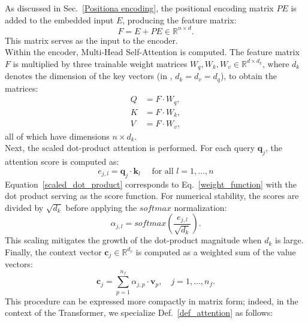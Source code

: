 As discussed in Sec.~\ref{Positiona encoding}, the positional encoding matrix $PE$ is added to the embedded input $E$, producing the feature matrix:
\begin{equation}
    F = E + PE \in \mathbb{R}^{n \times d}.
\end{equation}
This matrix serves as the input to the encoder.\\ 
Within the encoder, Multi-Head Self-Attention is computed. The feature matrix $F$ is multiplied by three trainable weight matrices $W_q, W_k, W_v \in \mathbb{R}^{d \times d_k}$, where $d_k$ denotes the dimension of the key vectors (in \cite{Att_is_all_u_need}, $d_k = d_v = d_q$), to obtain the matrices:
\begin{equation}\label{eq_from_features_to_matrix}
\begin{aligned}
    Q &= F \cdot W_q, \\
    K &= F \cdot W_k, \\
    V &= F \cdot W_v,
\end{aligned}
\end{equation}
all of which have dimensions $n \times d_k$.\\
Next, the scaled dot-product attention is performed. For each query $\mathbf{q}_j$, the attention score is computed as:
\begin{equation}\label{scaled_dot_product}
    e_{j,l} = \mathbf{q}_j \cdot \mathbf{k}_l \quad \text{ for all } l=1,\dots,n
\end{equation}
Equation~\eqref{scaled_dot_product} corresponds to Eq.~\eqref{weight_function} with the dot product serving as the score function.  
For numerical stability, the scores are divided by $\sqrt{d_k}$ before applying the $softmax$ normalization:
\begin{equation}
    \alpha_{j,l} = softmax\left(\frac{e_{j,l}}{\sqrt{d_k}}\right).
\end{equation}
This scaling mitigates the growth of the dot-product magnitude when $d_k$ is large.\\
Finally, the context vector $\mathbf{c}_j \in \mathbb{R}^{d_v}$ is computed as a weighted sum of the value vectors:
\begin{equation}
    \mathbf{c}_j = \sum_{p=1}^{n_{f}} \alpha_{j,p} \cdot \mathbf{v}_p, \quad j = 1, \dots, n_{f}.
\end{equation}
This procedure can be expressed more compactly in matrix form; indeed, in the context of the Transformer, we specialize Def.~\ref{def_attention} as follows:

